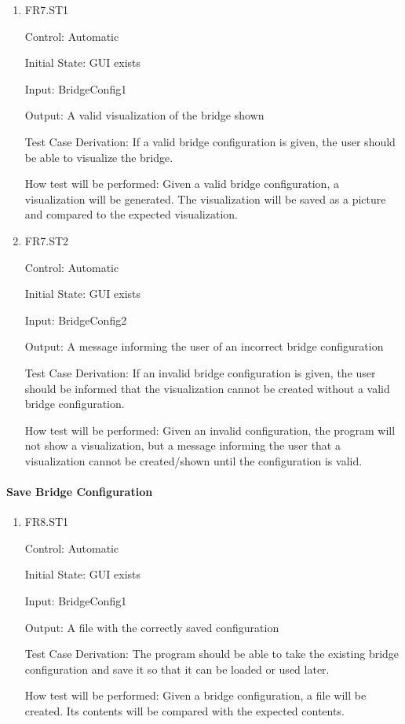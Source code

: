 \documentclass[12pt, titlepage]{article}
\begin{document}
\begin{enumerate}
  
  \item{FR7.ST1\\}
  
  Control: Automatic
  
  Initial State: GUI exists
  
  Input: BridgeConfig1
  
  Output: A valid visualization of the bridge shown
  
  Test Case Derivation: If a valid bridge configuration is given, the user should be able to
  visualize the bridge.
  
  How test will be performed: Given a valid bridge configuration, a visualization will be generated.
  The visualization will be saved as a picture and compared to the expected visualization.
  
  \item{FR7.ST2\\}
  
  Control: Automatic
  
  Initial State: GUI exists
  
  Input: BridgeConfig2
  
  Output: A message informing the user of an incorrect bridge configuration
  
  Test Case Derivation: If an invalid bridge configuration is given, the user should be informed
  that the visualization cannot be created without a valid bridge configuration.
  
  How test will be performed: Given an invalid configuration, the program will not show
  a visualization, but a message informing the user that a visualization cannot be created/shown
  until the configuration is valid.
  
\end{enumerate}

\paragraph{Save Bridge Configuration}

\begin{enumerate}

  \item{FR8.ST1\\}
  
  Control: Automatic
  
  Initial State: GUI exists
  
  Input: BridgeConfig1
  
  Output: A file with the correctly saved configuration
  
  Test Case Derivation: The program should be able to take the existing bridge configuration and
  save it so that it can be loaded or used later.
  
  How test will be performed: Given a bridge configuration, a file will be created. Its contents
  will be compared with the expected contents.

\end{enumerate}
\end{document}
